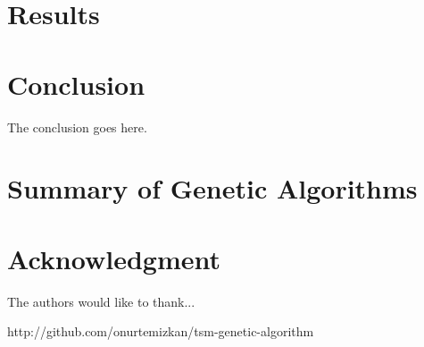 \documentclass[journal,transmag]{IEEEtran}
\begin{document}
    \section{Results}

    \section{Conclusion}
    The conclusion goes here.

    \appendices
    \section{Summary of Genetic Algorithms}

    \section*{Acknowledgment}
    The authors would like to thank...

    \ifCLASSOPTIONcaptionsoff
      \newpage
    \fi

    \begin{thebibliography}{1}

    http://github.com/onurtemizkan/tsm-genetic-algorithm
    \end{thebibliography}

    
\end{document}
